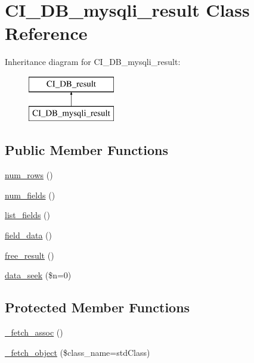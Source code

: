 \hypertarget{class_c_i___d_b__mysqli__result}{}\section{C\+I\+\_\+\+D\+B\+\_\+mysqli\+\_\+result Class Reference}
\label{class_c_i___d_b__mysqli__result}
Inheritance diagram for C\+I\+\_\+\+D\+B\+\_\+mysqli\+\_\+result\+:\begin{figure}[H]
\begin{center}
\leavevmode
\includegraphics[height=2.000000cm]{class_c_i___d_b__mysqli__result}
\end{center}
\end{figure}
\subsection*{Public Member Functions}
\begin{DoxyCompactItemize}
\item 
\mbox{\hyperlink{class_c_i___d_b__mysqli__result_a74083a12d5c0bf1c72ce48255a76cb2c}{num\+\_\+rows}} ()
\item 
\mbox{\hyperlink{class_c_i___d_b__mysqli__result_a63ec5ac3e71623384201d75a22c5d6d3}{num\+\_\+fields}} ()
\item 
\mbox{\hyperlink{class_c_i___d_b__mysqli__result_a7d89adb37a571f7f34d7da9ef58673ab}{list\+\_\+fields}} ()
\item 
\mbox{\hyperlink{class_c_i___d_b__mysqli__result_ae1b37bfa4507588d6ca5656b684e5d6a}{field\+\_\+data}} ()
\item 
\mbox{\hyperlink{class_c_i___d_b__mysqli__result_a224197ce4d52e03bc735d4179dbc2e49}{free\+\_\+result}} ()
\item 
\mbox{\hyperlink{class_c_i___d_b__mysqli__result_a79861c00259afb295749f928f9761456}{data\+\_\+seek}} (\$n=0)
\end{DoxyCompactItemize}
\subsection*{Protected Member Functions}
\begin{DoxyCompactItemize}
\item 
\mbox{\hyperlink{class_c_i___d_b__mysqli__result_a94c4334144be1e87dc5df825aa46adb6}{\+\_\+fetch\+\_\+assoc}} ()
\item 
\mbox{\hyperlink{class_c_i___d_b__mysqli__result_a867c1eb9bfb7dd635645ef741f81e7f6}{\+\_\+fetch\+\_\+object}} (\$class\+\_\+name=\textquotesingle{}std\+Class\textquotesingle{})
\end{DoxyCompactItemize}

